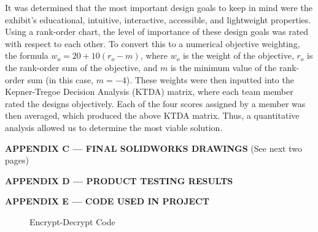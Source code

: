 \documentclass[conference]{IEEEtran}
\begin{document}
   \begin{justify}
     It was determined that the most important design goals to keep in mind were the exhibit's educational, intuitive, interactive, accessible, and lightweight properties. Using a rank-order chart, the level of importance of these design goals was rated with respect to each other. To convert this to a numerical objective weighting, the formula $w_o = 20 + 10(r_o - m)$, where $w_o$ is the weight of the objective, $r_o$ is the rank-order sum of the objective, and $m$ is the minimum value of the rank-order sum (in this case, $m=-4$). These weights were then inputted into the Kepner-Tregoe Decision Analysis (KTDA) matrix, where each team member rated the designs objectively. Each of the four scores assigned by a member was then averaged, which produced the above KTDA matrix. Thus, a quantitative analysis allowed us to determine the most viable solution.
   \end{justify} \Large

   \newpage


\hspace{.5in}   \textbf{APPENDIX C — FINAL SOLIDWORKS DRAWINGS}
\normalsize (See next two pages) \Large





 \hspace{.5in}   \textbf{APPENDIX D — PRODUCT TESTING RESULTS}  

 \newpage


 \hspace{.5in}   \textbf{APPENDIX E — CODE USED IN PROJECT}  

\begin{figure}[h!]
  \caption{Encrypt-Decrypt Code}
\end{figure}
\vspace{-15pt}

\end{document}
